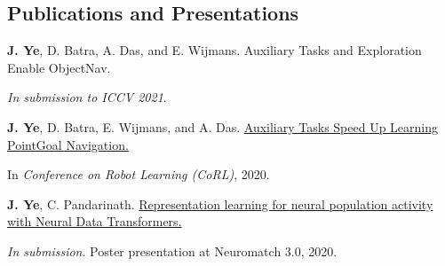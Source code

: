 \subsection*{Publications and Presentations}
    \textbf{J. Ye}, D. Batra, A. Das, and E. Wijmans. Auxiliary Tasks and Exploration Enable ObjectNav.

    \emph{In submission to ICCV 2021}.

    \textbf{J. Ye}, D. Batra, E. Wijmans, and A. Das.
    \href{https://arxiv.org/abs/2007.04561}
    {Auxiliary Tasks Speed Up Learning PointGoal Navigation.}

    In \emph{Conference on Robot Learning (CoRL)}, 2020.

    \textbf{J. Ye}, C. Pandarinath. \href{https://www.youtube.com/watch?v=lEXSdoIGNWY}
    {Representation learning for neural population activity with Neural Data Transformers.}

    \emph{In submission}. Poster presentation at Neuromatch 3.0, 2020.

